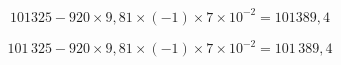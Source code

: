 \documentclass[12pt]{article}
\begin{document}

$$101 325 - 920 \times 9,81 \times (-1) \times 7 \times 10^{-2} = 101 389,4$$

$$101\,325 - 920 \times 9{,}81 \times (-1) \times 7 \times 10^{-2} = 101\, 389{,}4$$
\end{document}

